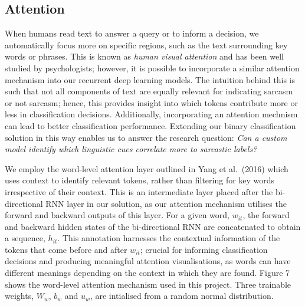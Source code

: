 \documentclass[12pt,a4paper]{article}
\begin{document}
	
	
	

\subsection{Attention}
\vspace{-4.2pt}
\noindent When humans read text to answer a query or to inform a decision, we automatically focus more on specific regions, such as the text surrounding key words or phrases. This is known as \textit{human visual attention} and has been well studied by psychologists; however, it is possible to incorporate a similar attention mechanism into our recurrent deep learning models. The intuition behind this is such that not all components of text are equally relevant for indicating sarcasm or not sarcasm; hence, this provides insight into which tokens contribute more or less in classification decisions. Additionally, incorporating an attention mechnism can lead to better classification performance. Extending our binary classification solution in this way enables us to answer the research question: \textit{Can a custom model identify which linguistic cues correlate more to sarcastic labels?}\\\vspace{-5pt}

\noindent We employ the word-level attention layer outlined in Yang et al.\ (2016) \cite{yang2016hierarchical} which uses context to identify relevant tokens, rather than filtering for key words irrespective of their context. This is an intermediate layer placed after the bi-directional RNN layer in our solution, as our attention mechanism utilises the forward and backward outputs of this layer. For a given word, $w_{it}$, the forward and backward hidden states of the bi-directional RNN are concatenated to obtain a sequence, $h_{it}$. This annotation harnesses the contextual information of the tokens that come before and after $w_{it}$; crucial for informing classification decisions and producing meaningful attention visualisations, as words can have different meanings depending on the context in which they are found. Figure 7 shows the word-level attention mechanism used in this project. Three trainable weights, $W_w$, $b_w$ and $u_w$, are intialised from a random normal distribution.\vspace{-10pt}
\end{document}
